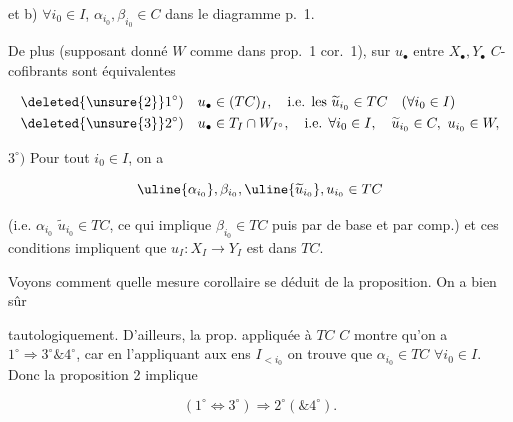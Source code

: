
et b) $\forall i_0\in I$,  $\alpha_{i_0},\beta_{i_0}\in C$ dans le diagramme  p.~1.

 De plus (supposant donné $W$ comme dans prop.~1 cor.~1),   sur $u_\bullet$ entre $X_\bullet,Y_\bullet$ $C$-cofibrants sont équivalentes

\[
\begin{aligned}
\deleted{\unsure{2}}1^\circ)&\quad u_\bullet\in(TC)_I,\quad\text{i.e. les }\widetilde u_{i_0}\in TC\quad(\forall i_0\in I)\\
\deleted{\unsure{3}}2^\circ)&\quad u_\bullet\in T_I\cap W_{I^\circ},\quad\text{i.e. }\forall i_0\in I,\quad\widetilde u_{i_0}\in C,\ u_{i_0}\in W,
\end{aligned}
\]

 $3^\circ)$ Pour tout $i_0\in I$, on a

\[
 \uline{\alpha_{i_0}},\beta_{i_0},\uline{\widetilde u_{i_0}},u_{i_0}\in TC
\]

(i.e. $\alpha_{i_0}$ \unsure{\&} $\widetilde u_{i_0}\in TC$, ce qui implique $\beta_{i_0}\in TC$ puis  par  de base et par comp.) et ces conditions impliquent  que $u_I:X_I\to Y_I$ est dans $TC$.

Voyons comment  quelle mesure  corollaire se déduit de la proposition. On a bien sûr


tautologiquement. D’ailleurs, la prop. appliquée à $TC$  $C$ montre qu’on a $1^\circ\Rightarrow 3^\circ\mathbin{\&}4^\circ$, car en l’appliquant aux ens $I_{<i_0}$ on trouve que $\alpha_{i_0}\in TC$ $\forall i_0\in I$. Donc la proposition 2 implique

\[
 (1^\circ\Longleftrightarrow3^\circ)\Longrightarrow 2^\circ(\mathbin{\&}4^\circ).
\]

